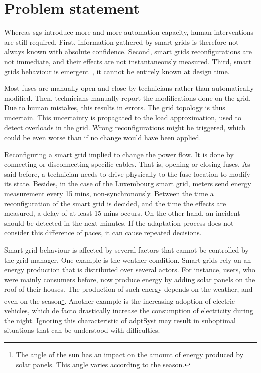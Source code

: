 \section{Problem statement}

Whereas \glspl{sg} introduce more and more automation capacity, human interventions are still required.
First, information gathered by smart grids is therefore not always known with absolute confidence.
Second, smart grids reconfigurations are not immediate, and their effects are not instantaneously measured.
Third, smart grids behaviour is emergent~\cite{zio2011uncertainties}, \ie it cannot be entirely known at design time.

Most fuses are manually open and close by technicians rather than automatically modified.
Then, technicians manually report the modifications done on the grid.
Due to human mistakes, this results in errors.
The grid topology is thus uncertain.
This uncertainty is propagated to the load approximation, used to detect overloads in the grid.
Wrong reconfigurations might be triggered, which could be even worse than if no change would have been applied.

Reconfiguring a smart grid implied to change the power flow.
It is done by connecting or disconnecting specific cables.
That is, opening or closing fuses.
As said before, a technician needs to drive physically to the fuse location to modify its state.
Besides, in the case of the Luxembourg smart grid, meters send energy measurement every 15 mins, non-synchronously.
Between the time a reconfiguration of the smart grid is decided, and the time the effects are measured, a delay of at least 15 mins occurs.
On the other hand, an incident should be detected in the next minutes.
If the adaptation process does not consider this difference of paces, it can cause repeated decisions.

Smart grid behaviour is affected by several factors that cannot be controlled by the grid manager.
One example is the weather condition.
Smart grids rely on an energy production that is distributed over several actors.
For instance, users, who were mainly consumers before, now produce energy by adding solar panels on the roof of their houses.
The production of such energy depends on the weather, and even on the season\footnote{The angle of the sun has an impact on the amount of energy produced by solar panels. This angle varies according to the season.}.
Another example is the increasing adoption of electric vehicles, which de facto drastically increase the consumption of electricity during the night.
Ignoring this characteristic of \gls{adptSyst} may result in suboptimal situations that can be understood with difficulties.






